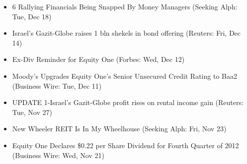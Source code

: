 \documentclass[11pt,asymmetric]{article}
\begin{document}
\begin{itemize}
\item 6 Rallying Financials Being Snapped By Money Managers (Seeking Alph: Tue, Dec 18)
\item Israel's Gazit-Globe raises 1 bln shekels in bond offering (Reuters: Fri, Dec 14)
\item Ex-Div Reminder for Equity One (Forbes: Wed, Dec 12)
\item Moody’s Upgrades Equity One’s Senior Unsecured Credit Rating to Baa2 (Business Wire: Tue, Dec 11)
\item UPDATE 1-Israel's Gazit-Globe profit rises on rental income gain (Reuters: Tue, Nov 27)
\item New Wheeler REIT Is In My Wheelhouse (Seeking Alph: Fri, Nov 23)
\item Equity One Declares \$0.22 per Share Dividend for Fourth Quarter of 2012 (Business Wire: Wed, Nov 21)
\end{itemize}
\end{document}
